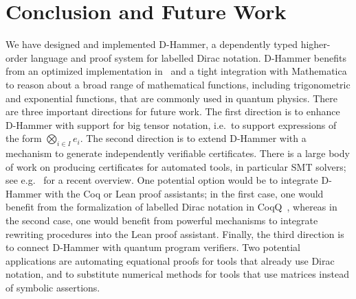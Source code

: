 



\section{Conclusion and Future Work}
We have designed and implemented D-Hammer, a dependently typed
higher-order language and proof system for labelled Dirac
notation. D-Hammer benefits from an optimized implementation in
\CC\ and a tight integration with Mathematica to reason about a broad
range of mathematical functions, including trigonometric and
exponential functions, that are commonly used in quantum physics.
There are three important directions for future work. The first
direction is to enhance D-Hammer with support for big tensor notation,
i.e.\, to support expressions of the form $\bigotimes_{i\in I}
e_i$. The second direction is to extend D-Hammer with a mechanism to
generate independently verifiable certificates.  There is a large body
of work on producing certificates for automated tools, in particular
SMT solvers; see e.g.~\cite{DBLP:journals/cacm/BarbosaBCDKLNNOPRTZ23}
for a recent overview. One potential option would be to integrate
D-Hammer with the Coq or Lean proof assistants; in the first case, one
would benefit from the formalization of labelled Dirac notation in
CoqQ~\cite{Zhou2023}, whereas in the second case, one would benefit
from powerful mechanisms to integrate rewriting procedures into the
Lean proof assistant. Finally, the third direction is to connect
D-Hammer with quantum program verifiers. Two potential applications
are automating equational proofs for tools that already use Dirac
notation, and to substitute numerical methods for tools that use
matrices instead of symbolic assertions.






